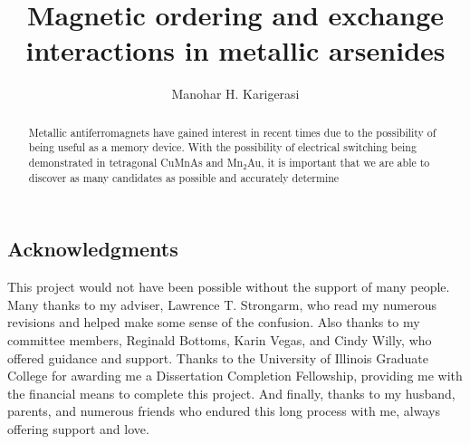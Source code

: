 \documentclass[11pt,edeposit,draftthesis]{uiucthesis2020}
\title{Magnetic ordering and exchange interactions in metallic arsenides}
\author{Manohar H. Karigerasi}
\begin{document}
\maketitle


\begin{frontmatter}

\begin{abstract}
Metallic antiferromagnets have gained interest in recent times due to the possibility of being useful as a memory device. With the possibility of electrical switching being demonstrated in tetragonal CuMnAs and Mn$_2$Au, it is important that we are able to discover as many candidates as possible and accurately determine
\end{abstract}

\chapter*{Acknowledgments}

This project would not have been possible without the support of
many people. Many thanks to my adviser, Lawrence T. Strongarm, who
read my numerous revisions and helped make some sense of the
confusion. Also thanks to my committee members, Reginald Bottoms,
Karin Vegas, and Cindy Willy, who offered guidance and support.
Thanks to the University of Illinois Graduate College for awarding
me a Dissertation Completion Fellowship, providing me with the
financial means to complete this project. And finally, thanks to
my husband, parents, and numerous friends who endured this long
process with me, always offering support and love.


\tableofcontents
\listoftables
\listoffigures

\end{frontmatter}


\end{document}
